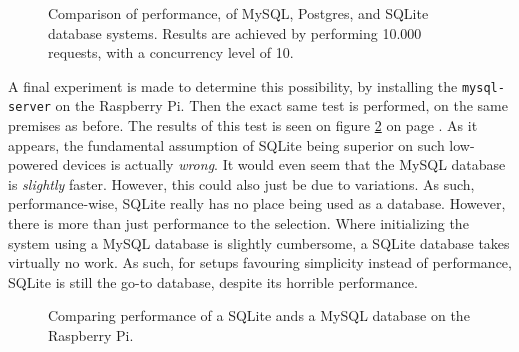	\begin{figure}[!h]
		\centering
	    \caption{Comparison of performance, of MySQL, Postgres, and SQLite database systems. Results are achieved by performing 10.000 requests, with a concurrency level of 10.}
	    \label{fig:bench:db}
	\end{figure}

	A final experiment is made to determine this possibility, by installing the \verb=mysql-server= on the Raspberry Pi. Then the exact same test is performed, on the same premises as before. The results of this test is seen on figure \ref{fig:bench:rpi-bench} on page \pageref{fig:bench:rpi-bench}. As it appears, the fundamental assumption of SQLite being superior on such low-powered devices is actually \emph{wrong}. It would even seem that the MySQL database is \emph{slightly} faster. However, this could also just be due to variations. As such, performance-wise, SQLite really has no place being used as a database. However, there is more than just performance to the selection. Where initializing the system using a MySQL database is slightly cumbersome, a SQLite database takes virtually no work. As such, for setups favouring simplicity instead of performance, SQLite is still the go-to database, despite its horrible performance.

	\begin{figure}[!h]
		\centering
	    \caption{Comparing performance of a SQLite ands a MySQL database on the Raspberry Pi.}
	    \label{fig:bench:rpi-bench}
	\end{figure}


